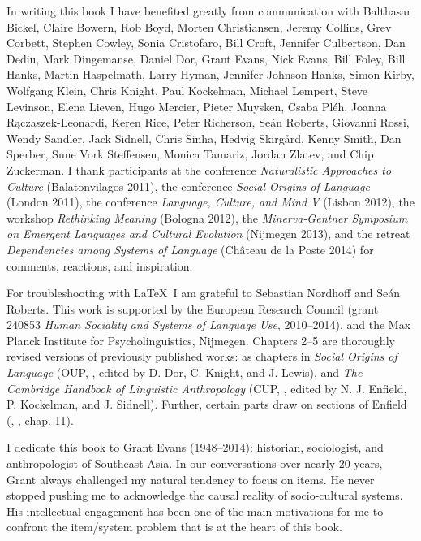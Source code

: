 
In writing this book I have benefited greatly from communication with Balthasar Bickel, Claire Bowern, Rob 
Boyd, Morten Christiansen, Jeremy Collins, Grev Corbett, Stephen Cowley, Sonia Cristofaro, Bill Croft, Jennifer Culbertson, Dan Dediu, Mark Dingemanse, Daniel Dor, Grant Evans\dag, Nick Evans, Bill Foley, Bill Hanks, Martin Haspelmath, Larry Hyman, Jennifer Johnson-Hanks, Simon Kirby, Wolfgang Klein, Chris Knight, Paul Kockelman, Michael Lempert, Steve Levinson, Elena Lieven, Hugo Mercier, Pieter Muysken, Csaba Pl\'{e}h, Joanna R\k{a}czaszek-Leonardi, Keren Rice, Peter Richerson, Se\'{a}n Roberts, Giovanni Rossi, Wendy Sandler, Jack Sidnell, Chris Sinha, Hedvig Skirg\aa{}rd, Kenny Smith, Dan Sperber, Sune Vork Steffensen, Monica Tamariz, Jordan Zlatev, and Chip Zuckerman. I thank participants at the conference 
\textit{Naturalistic Approaches to Culture} (Balatonvilagos 2011), the 
conference \textit{Social Origins of Language} (London 2011), the 
conference \textit{Language, Culture, and Mind V} (Lisbon 2012), the workshop 
\textit{Rethinking Meaning} (Bologna 2012), the \textit{Minerva-Gentner Symposium on 
Emergent Languages and Cultural Evolution} (Nijmegen 2013), and the retreat \textit{Dependencies among Systems of Language} (Ch\^{a}teau de la Poste 2014) for comments, reactions, and inspiration. 

For troubleshooting with \LaTeX\ I am grateful to Sebastian Nordhoff and Se\'{a}n Roberts. This work is supported by the European Research Council 
(grant 240853 \textit{Human Sociality and Systems of Language Use}, 2010--2014), and 
the Max Planck Institute for Psycholinguistics, Nijmegen. Chapters 2--5 are thoroughly revised versions of previously published works: as chapters in 
\textit{Social Origins of Language} (OUP, \citeyear{DorEtAl2014}, edited by D. Dor, C. Knight, and J. Lewis), and \textit{The Cambridge Handbook of Linguistic Anthropology} 
(CUP, \citeyear{EnfieldEtAl2014handbookla}, edited by N. J. Enfield, P. Kockelman, and J. Sidnell). Further, certain parts draw on sections of Enfield (\citeyear{enfield_transmission_2008}, \citeyear{enfield_relationship_2013}, 
chap. 11).

I dedicate this book to Grant Evans (1948--2014): historian, sociologist, and anthropologist of Southeast Asia. In our conversations over nearly 20 years, Grant always challenged my natural tendency to focus on items. He never stopped pushing me to acknowledge the causal reality of socio-cultural systems. His intellectual engagement has been one of the main motivations for me to confront the item/system problem that is at the heart of this book.